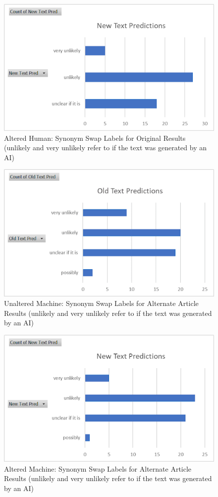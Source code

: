 \documentclass{article}
\begin{document}
\begin{figure}[H]
    \centering
    \includegraphics[width=.75\linewidth]{AlteredHuman.png}
    \caption{Altered Human: Synonym Swap Labels for Original Results (unlikely and very unlikely refer to if the text was generated by an AI)}
    \label{fig:enter-label}
\end{figure}

\begin{figure}[H]
    \centering
    \includegraphics[width=.75\linewidth]{UnalteredMachine.png}
    \caption{Unaltered Machine: Synonym Swap Labels for Alternate Article Results (unlikely and very unlikely refer to if the text was generated by an AI)}
    \label{fig:enter-label}
\end{figure}

\begin{figure}[H]
    \centering
    \includegraphics[width=.75\linewidth]{AlteredMachine.png}
    \caption{Altered Machine: Synonym Swap Labels for Alternate Article Results (unlikely and very unlikely refer to if the text was generated by an AI)}
    \label{fig:enter-label}
\end{figure}
\end{document}
